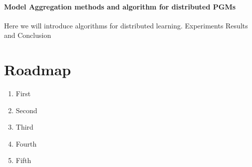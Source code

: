     \paragraph{Model Aggregation methods and algorithm for distributed PGMs}
    Here we will introduce algorithms for distributed learning.
    Experiments
    Results and Conclusion
    \section{Roadmap}
    \begin{enumerate}
       \item First 
       \item Second
       \item Third
       \item Fourth
       \item Fifth
    \end{enumerate}